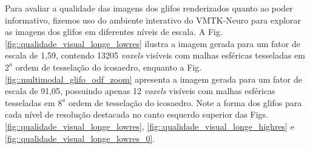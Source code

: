 
Para avaliar a qualidade das imagens dos glifos renderizados quanto ao poder informativo, fizemos uso do ambiente interativo do VMTK-Neuro para explorar as imagens dos glifos em diferentes níveis de escala. A Fig. \ref{fig::qualidade_visual_longe_lowres} ilustra a imagem gerada para um fator de escala de 1,59, contendo 13205 \textit{voxels} visíveis com malhas esféricas tesseladas em $2^a$ ordem de tesselação do icosaedro, enquanto a Fig. \ref{fig::multimodal_glifo_odf_zoom} apresenta a imagem gerada para um fator de escala de 91,05, possuindo apenas 12 \textit{voxels} visíveis com malhas esféricas tesseladas em  $8^a$ ordem de tesselação do icosaedro. Note a forma dos glifos para cada nível de resolução destacada no canto esquerdo superior das Figs. \ref{fig::qualidade_visual_longe_lowres},  \ref{fig::qualidade_visual_longe_highres} e \ref{fig::qualidade_visual_longe_lowres_0}.


